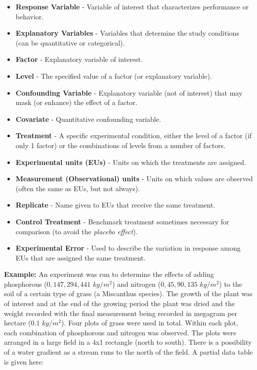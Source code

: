 \documentclass[]{book}
\begin{document}
\begin{itemize}
\item \textbf{Response Variable} - Variable of interest that characterizes performance or behavior.
\item \textbf{Explanatory Variables} - Variables that determine the study conditions (can be quantitative or categorical).
\item \textbf{Factor} - Explanatory variable of interest.
\item \textbf{Level} -  The specified value of a factor (or explanatory variable).
\item \textbf{Confounding Variable} - Explanatory variable (not of interest) that may mask (or enhance) the effect of a factor.
\item \textbf{Covariate} - Quantitative confounding variable.
\item \textbf{Treatment} - A specific experimental condition, either the level of a factor (if only 1 factor) or the combinations of levels from a number of factors.
\item \textbf{Experimental units (EUs)} - Units on which the treatments are assigned.
\item \textbf{Measurement (Observational) units} - Units on which values are observed (often the same as EUs, but not always).
\item \textbf{Replicate} - Name given to EUs that receive the same treatment.
\item \textbf{Control Treatment} - Benchmark treatment sometimes necessary for comparison (to avoid the \textit{placebo effect}).
\item \textbf{Experimental Error} - Used to describe the variation in response among EUs that are assigned the same treatment.
\end{itemize}

\textbf{Example: } An experiment was run to determine the effects of
adding phosphorous (\(0, 147, 294, 441\) \(kg/m^2\)) and nitrogen
(\(0, 45, 90, 135\) \(kg/m^2\)) to the soil of a certain type of grass
(a Miscanthus species). The growth of the plant was of interest and at
the end of the growing period the plant was dried and the weight
recorded with the final measurement being recorded in megagram per
hectare (\(0.1\) \(kg/m^2\)). Four plots of grass were used in total.
Within each plot, each combination of phosphorous and nitrogen was
observed. The plots were arranged in a large field in a 4x1 rectangle
(north to south). There is a possibility of a water gradient as a stream
runs to the north of the field. A partial data table is given here:
\end{document}
